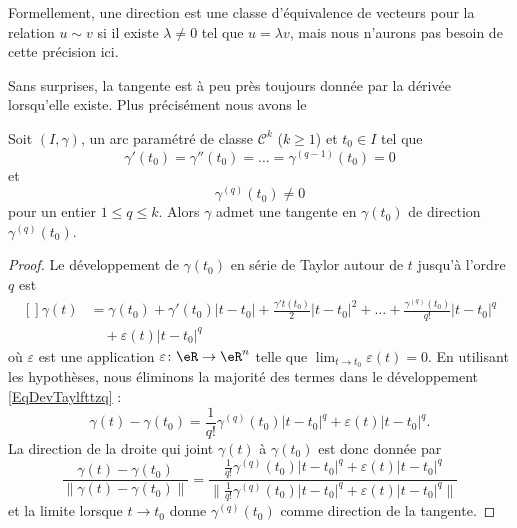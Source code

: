 Formellement, une direction est une classe d'équivalence de vecteurs pour la relation $u\sim v$ si il existe $\lambda\neq 0$ tel que $u=\lambda v$, mais nous n'aurons pas besoin de cette précision ici.

Sans surprises, la tangente est à peu près toujours donnée par la dérivée lorsqu'elle existe. Plus précisément nous avons le
\begin{theorem}
Soit $(I,\gamma)$, un arc paramétré de classe $\mathcal{C}^k$ ($k\geq 1$) et $t_0\in I$ tel que
\begin{equation}
    \gamma'(t_0)=\gamma''(t_0)=\ldots=\gamma^{(q-1)}(t_0)=0
\end{equation}
et
\begin{equation}
    \gamma^{(q)}(t_0)\neq 0
\end{equation}
pour un entier $1\leq q\leq k$. Alors $\gamma$ admet une tangente en $\gamma(t_0)$ de direction $\gamma^{(q)}(t_0)$.
\end{theorem}

\begin{proof}

Le développement de $\gamma(t_0)$ en série de Taylor autour de $t$ jusqu'à l'ordre $q$ est
\begin{equation}        \label{EqDevTaylfttzq}
    \begin{aligned}[]
        \gamma(t)&=\gamma(t_0)+\gamma'(t_0)| t-t_0 |+\frac{ \gamma't(t_0) }{2}| t-t_0 |^2+\ldots +\frac{ \gamma^{(q)}(t_0) }{ q! }| t-t_0 |^q\\
            &\quad+\varepsilon(t)| t-t_0 |^q
    \end{aligned}
\end{equation}
où $\varepsilon$ est une application $\varepsilon\colon \eR\to \eR^n$ telle que $\lim_{t\to t_0} \varepsilon(t)=0$. En utilisant les hypothèses, nous éliminons la majorité des termes dans le développement \eqref{EqDevTaylfttzq} :
\begin{equation}
    \gamma(t)-\gamma(t_0)=\frac{1}{ q! }\gamma^{(q)}(t_0)| t-t_0 |^q+\varepsilon(t)| t-t_0 |^q.
\end{equation}
La direction de la droite qui joint $\gamma(t)$ à $\gamma(t_0)$ est donc donnée par
\begin{equation}
    \frac{ \gamma(t)-\gamma(t_0) }{ \| \gamma(t)-\gamma(t_0) \| }=\frac{ \frac{1}{ q! }\gamma^{(q)}(t_0)| t-t_0 |^q+\varepsilon(t)| t-t_0 |^q }{ \| \frac{1}{ q! }\gamma^{(q)}(t_0)| t-t_0 |^q+\varepsilon(t)| t-t_0 |^q\|  }
\end{equation}
et la limite lorsque $t\to t_0$ donne $\gamma^{(q)}(t_0)$ comme direction de la tangente.

\end{proof}

